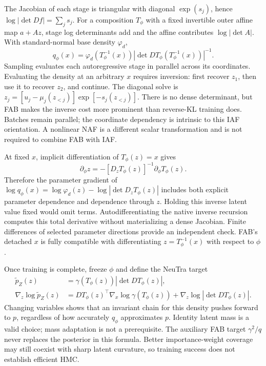 The Jacobian of each stage is triangular with diagonal $\exp(s_j)$, hence
$\log|\det Df|=\sum_js_j$. For a composition $T_\phi$ with a fixed invertible
outer affine map $a+Az$, stage log determinants add and the affine contributes
$\log|\det A|$. With standard-normal base density $\varphi_d$,
\begin{equation}
 q_\phi(x)=\varphi_d(T_\phi^{-1}(x))
 |\det DT_\phi(T_\phi^{-1}(x))|^{-1}.
 \label{eq:bf-fab-iaf-density}
\end{equation}
Sampling evaluates each autoregressive stage in parallel across its coordinates.
Evaluating the density at an arbitrary $x$ requires inversion: first recover
$z_1$, then use it to recover $z_2$, and continue. The diagonal solve is
$z_j=[u_j-\mu_j(z_{<j})]\exp[-s_j(z_{<j})]$. There is no dense determinant,
but FAB makes the inverse cost more prominent than reverse-KL training does.
Batches remain parallel; the coordinate dependency is intrinsic to this IAF
orientation. A nonlinear NAF \citep{huang2018naf} is a different scalar
transformation and is not required to combine FAB with IAF.

At fixed $x$, implicit differentiation of $T_\phi(z)=x$ gives
\begin{equation}
 \partial_\phi z=-[D_zT_\phi(z)]^{-1}\partial_\phi T_\phi(z).
 \label{eq:bf-fab-inverse-derivative}
\end{equation}
Therefore the parameter gradient of
$\log q_\phi(x)=\log\varphi_d(z)-\log|\det D_zT_\phi(z)|$ includes both
explicit parameter dependence and dependence through $z$. Holding this inverse
latent value fixed would omit terms. Autodifferentiating the native inverse
recursion computes this total derivative without materializing a dense
Jacobian. Finite differences of selected parameter directions provide an
independent check. FAB's detached $x$ is fully compatible with differentiating
$z=T_\phi^{-1}(x)$ with respect to $\phi$.

Once training is complete, freeze $\phi$ and define the NeuTra target
\begin{align}
 \widetilde p_Z(z)&=\gamma(T_\phi(z))|\det DT_\phi(z)|,\\
 \nabla_z\log\widetilde p_Z(z)
 &=DT_\phi(z)^\top\nabla_x\log\gamma(T_\phi(z))
                   +\nabla_z\log|\det DT_\phi(z)|.
 \label{eq:bf-fab-neutra-target}
\end{align}
Changing variables shows that an invariant chain for this density pushes
forward to $p$, regardless of how accurately $q_\phi$ approximates $p$.
Identity latent mass is a valid choice; mass adaptation is not a prerequisite.
The auxiliary FAB target $\gamma^2/q$ never replaces the posterior in this
formula. Better importance-weight coverage may still coexist with sharp
latent curvature, so training success does not establish efficient HMC.

